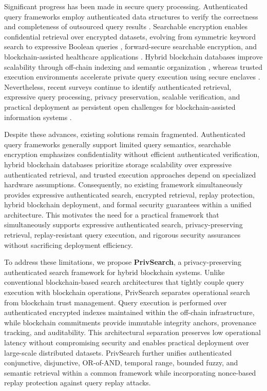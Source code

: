 Significant progress has been made in secure query processing. Authenticated query frameworks employ authenticated data structures to verify the correctness and completeness of outsourced query results \cite{Yang,Xu,Yin,Wu}. Searchable encryption enables confidential retrieval over encrypted datasets, evolving from symmetric keyword search \cite{Curtmola} to expressive Boolean queries \cite{Cash}, forward-secure searchable encryption, and blockchain-assisted healthcare applications \cite{LeeJoonYoung,Zhang,Yao,Lu}. Hybrid blockchain databases improve scalability through off-chain indexing and semantic organization \cite{Li,Zhou}, whereas trusted execution environments accelerate private query execution using secure enclaves \cite{WuHaotian}. Nevertheless, recent surveys continue to identify authenticated retrieval, expressive query processing, privacy preservation, scalable verification, and practical deployment as persistent open challenges for blockchain-assisted information systems \cite{Asiamah}.

Despite these advances, existing solutions remain fragmented. Authenticated query frameworks generally support limited query semantics, searchable encryption emphasizes confidentiality without efficient authenticated verification, hybrid blockchain databases prioritize storage scalability over expressive authenticated retrieval, and trusted execution approaches depend on specialized hardware assumptions. Consequently, no existing framework simultaneously provides expressive authenticated search, encrypted retrieval, replay protection, hybrid blockchain deployment, and formal security guarantees within a unified architecture. This motivates the need for a practical framework that simultaneously supports expressive authenticated search, privacy-preserving retrieval, replay-resistant query execution, and rigorous security assurances without sacrificing deployment efficiency.

To address these limitations, we propose \textbf{PrivSearch}, a privacy-preserving authenticated search framework for hybrid blockchain systems. Unlike conventional blockchain-based search architectures that tightly couple query execution with blockchain operations, PrivSearch separates operational search from blockchain trust management. Query execution is performed over authenticated encrypted indexes maintained within the off-chain infrastructure, while blockchain commitments provide immutable integrity anchors, provenance tracking, and auditability. This architectural separation preserves low operational latency without compromising security and enables practical deployment over large-scale distributed datasets. PrivSearch further unifies authenticated conjunctive, disjunctive, OR-of-AND, temporal range, bounded fuzzy, and semantic retrieval within a common framework while incorporating nonce-based replay protection against query replay attacks.

